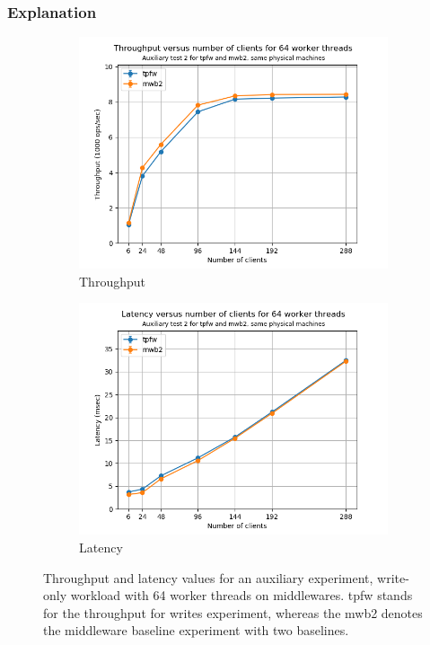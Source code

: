 \documentclass[11pt,a4paper]{article}
\begin{document}
\subsubsection{Explanation} \label{sec:tpfw-exp}
\begin{figure}[h]
\centering
\begin{subfigure}{.5\textwidth}
  \centering
  \includegraphics[width=1.0\linewidth,trim={5px 0px 10px 0px},clip]{img/plot/auxiliary-2-tp_mw.png}
  \caption{Throughput}
  \label{fig:auxiliary-2-tp_mw}
\end{subfigure}%
\begin{subfigure}{.5\textwidth}
  \centering
  \includegraphics[width=1.0\linewidth,trim={5px 0px 10px 0px},clip]{img/plot/auxiliary-2-lat_mw.png}
  \caption{Latency}
  \label{fig:auxiliary-2-lat_mw}
\end{subfigure}
\caption{Throughput and latency values for an auxiliary experiment, write-only workload with 64 worker threads on middlewares. tpfw stands for the throughput for writes experiment, whereas the mwb2 denotes the middleware baseline experiment with two baselines.}
\label{fig:auxiliary-2_mw}
\end{figure}
\end{document}
